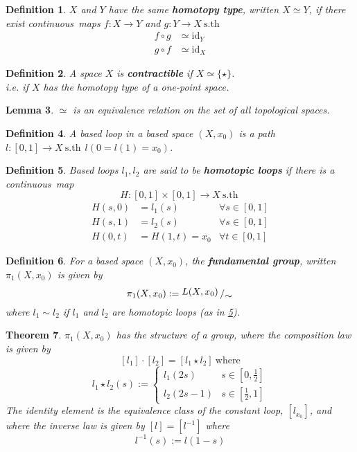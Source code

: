 \documentclass{article}
\newcommand{\sth}{\mathrm{s.th}\ }
\newcommand{\quotient}[2]{{\raisebox{.2em}{$#1$}\left/\raisebox{-.2em}{$#2$}\right.}}
\newcommand{\cts}{continuous\ }
\newtheorem{theorem}{Theorem}[section]
\newtheorem{lemma}[theorem]{Lemma}
\newtheorem{definition}[theorem]{Definition}
\theoremstyle{remark}
\theoremstyle{example}
\theoremstyle{examples}
\begin{document}
	\begin{definition}
		$X$ and $Y$ have the same \textbf{homotopy type}, written $X \simeq Y$,
		if there exist \cts maps $f:X\to Y$ and $g:Y \to X\ \sth$
		\begin{align*}
			f \circ g &\simeq \mathrm{id}_Y\\
			g \circ f &\simeq \mathrm{id}_X
		\end{align*}
	\end{definition}

	\begin{definition}
		A space $X$ is \textbf{contractible} if $X \simeq \{\star\}$.\\
		i.e. if $X$ has the homotopy type of a one-point space.
	\end{definition}

	\begin{lemma}
		$\simeq$ is an equivalence relation on the set of all topological spaces.
	\end{lemma}

	\begin{definition}
		A based loop in a based space $(X,x_0)$ is a path $l:[0,1] \to X\ \sth\ l(0=l(1)=x_0)$.
	\end{definition}

	\begin{definition}
		\label{defhomotopicloops}
		Based loops $l_1, l_2$ are said to be \textbf{homotopic loops} if there is a \cts map
		\[H:[0,1] \times [0,1] \to X\ \sth\]
		\begin{align*}
			H(s,0)&=l_1(s)&\forall s \in [0,1]\\
			H(s,1)&=l_2(s)&\forall s \in [0,1]\\
			H(0,t)&=H(1,t)=x_0&\forall t \in [0,1]
		\end{align*}
	\end{definition}

	\begin{definition}
		For a based space $(X,x_0)$, the \textbf{fundamental group},
		written $\pi_1(X,x_0)$ is given by
		\[\pi_1(X,x_0):=\quotient{L(X,x_0)}{\sim}\]
		where $l_1 \sim l_2$ if $l_1$ and $l_2$ are homotopic loops
		(as in \ref{defhomotopicloops}).
	\end{definition}

	\begin{theorem}
		$\pi_1(X,x_0)$ has the structure of a group, where the composition law
		is given by
		\[[l_1]\cdot[l_2]=[l_1 \star l_2]\ \mathrm{where}\]
		\[l_1 \star l_2(s):=\begin{cases}
			l_1(2s) & s \in [0,\frac12]\\
			l_2(2s-1) & s \in [\frac12,1]
		\end{cases}
		\]
		The identity element is the equivalence class of the constant loop,
		$[l_{x_0}]$, and where the inverse law is given by $[l]=[l^{-1}]$ where
		\[l^{-1}(s):=l(1-s)\]
	\end{theorem}
\end{document}
